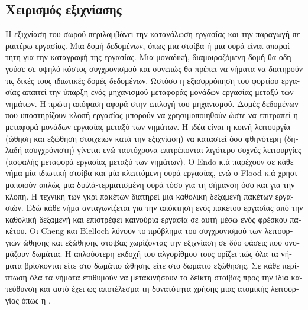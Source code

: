 \begin{greek}
\subsection{Χειρισμός εξιχνίασης}
Η εξιχνίαση του σωρού περιλαμβάνει την κατανάλωση εργασίας
και την παραγωγή περαιτέρω εργασίας. Μια δομή δεδομένων, όπως
μια στοίβα ή μια ουρά είναι απαραίτητη για την καταγραφή
της εργασίας. Μια μοναδική, διαμοιραζόμενη δομή θα οδηγούσε
σε υψηλό κόστος συγχρονισμού και συνεπώς θα πρέπει να νήματα
να διατηρούν τις δικές τους ιδιωτικές δομές δεδομένων. Ωστόσο
η εξισορρόπηση του φορτίου εργασίας απαιτεί την ύπαρξη ενός
μηχανισμού μεταφοράς μονάδων εργασίας μεταξύ των νημάτων.
Η πρώτη απόφαση αφορά στην επιλογή του μηχανισμού. Δομές
δεδομένων που υποστηρίζουν κλοπή εργασίας μπορούν να χρησιμοποιηθούν
ώστε να επιτραπεί η μεταφορά μονάδων εργασίας μεταξύ των νημάτων.
Η ιδέα είναι η κοινή λειτουργία (ώθηση και εξώθηση στοιχείων
κατά την εξιχνίαση) να καταστεί όσο φθηνότερη (δηλαδή ασυγχρόνιστη)
γίνεται ενώ ταυτόχρονα επιτρέπονται λιγότερο συχνές λειτουργίες
(ασφαλής μεταφορά εργασίας μεταξύ των νημάτων). Ο Endo κ.ά
\cite{DBLP:conf/sc/EndoTY97} παρέχουν σε κάθε νήμα μία ιδιωτική
στοίβα και μία κλεπτόμενη ουρά εργασίας, ενώ ο Flood κ.ά
\cite{DBLP:conf/jvm/FloodDSZ01}
χρησιμοποιούν απλώς μια διπλά-τερματισμένη ουρά τόσο για τη
σήμανση όσο και για την κλοπή. Η τεχνική των γκρι πακέτων
\cite{DBLP:conf/pldi/OssiaBGKLO02}
διατηρεί μια καθολική δεξαμενή πακέτων εργασιών. Εδώ κάθε
νήμα ανταγωνίζεται για την απόκτηση ενός πακέτου εργασίας
από την καθολική δεξαμενή και επιστρέφει καινούρια εργασία
σε αυτή μέσω ενός φρέσκου πακέτου. Οι Cheng και Blelloch
\cite{DBLP:conf/pldi/ChengB01} λύνουν το πρόβλημα του συγχρονισμού των λειτουργιών
ώθησης και εξώθησης στοίβας χωρίζοντας την εξιχνίαση σε δύο
φάσεις που ονομάζουν δωμάτια. Η απλούστερη εκδοχή του αλγορίθμου
τους ορίζει πώς όλα τα νήματα βρίσκονται είτε στο δωμάτιο
ώθησης είτε στο δωμάτιο εξώθησης. Σε κάθε περίπτωση όλα τα
νήματα επιθυμούν να μετακινήσουν το δείκτη στοίβας προς την
ίδια κατεύθυνση και αυτό έχει ως αποτέλεσμα τη δυνατότητα
χρήσης μιας ατομικής λειτουργίας όπως η .


\end{greek}
